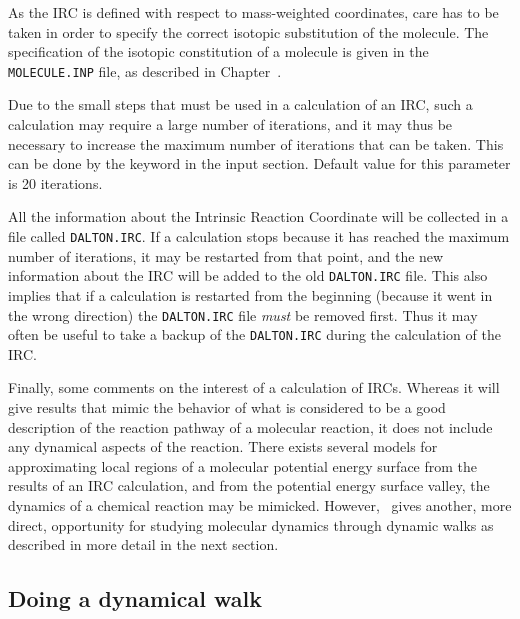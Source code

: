 As the IRC is defined with respect to mass-weighted
coordinates, care
has to be taken in order to specify the correct isotopic substitution
of the molecule. The specification of the isotopic constitution of a
molecule is given in the \verb|MOLECULE.INP| file, as described in
Chapter~\cite{ch:molinp}. 

Due to the small steps that must be used in a calculation of an IRC,
such a calculation may require a large number of
iterations, and it
may thus be necessary to increase the maximum number of iterations
that can be taken.  This can be done by
the keyword  in the  input
section. Default value for this parameter is 20 iterations.

All the information about the Intrinsic Reaction Coordinate will be
collected in a file called \texttt{DALTON.IRC}. If a
calculation stops
because it has reached the maximum number of iterations, it may be
restarted from that point, and the new information about the IRC will
be added to the old \texttt{DALTON.IRC} file. This also implies that if a
calculation is restarted from the beginning (because it went in the
wrong direction) the \texttt{DALTON.IRC} file {\em must\/} be removed
first. Thus it may often be useful to take a backup of the
\texttt{DALTON.IRC} during the calculation of the IRC.

Finally, some comments on the interest of a calculation of IRCs.
Whereas it will give results that mimic the behavior of what is
considered to be a good description of the reaction
pathway of a
molecular reaction, it does not include any dynamical aspects of the
reaction. There exists several models for approximating local regions of a
molecular potential energy surface from the results of an IRC
calculation, and from the
potential energy surface valley, the dynamics of a
chemical reaction may be
mimicked. However, \dalton\ gives another, more direct, opportunity
for studying molecular dynamics through dynamic walks as described in
more detail in the next section.

\subsection{Doing a dynamical walk}\label{sec:dynamic}

\begin{center}
\end{center}

